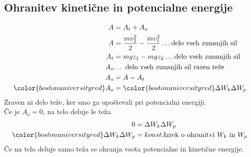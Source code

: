 {\color{indiagreen}\subsection{Ohranitev kinetične in potencialne energije}}
\begin{align*}
	A &= A_t + A_o\\
	A &= \frac{mv_2^2}{2} - \frac{mv_1^2}{2} \dots \text{delo vseh zunanjih sil}\\
	A_t &= mgz_1 - mgz_2 \dots \text{delo vseh zunanjih sil}\\
	A_o & \text{$\dots$ delo vseh zunanjih sil razen teže}\\
	A_o &= A - A_t\\
	{\color{bostonuniversityred}A_o} &= {\color{bostonuniversityred}\Delta W_k\Delta W_p}\\
\end{align*}
Zraven ni delo teže, ker smo ga upoštevali pri potencialni energiji.\\
Če je $A_o = 0$, na telo deluje le teža.\\
\begin{align*}
	0 &= \Delta W_k \Delta W_p\\
	{\color{bostonuniversityred}\Delta W_k \Delta W_p} &= konst. \text{Izrek o ohranitvi $W_k$ in $W_p$}\\
\end{align*}
Če na telo deluje samo teža se ohranja vsota potencialne in kinetične energije.\\